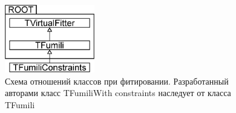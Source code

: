 


\begin{figure}[h]
\centering
\centering\includegraphics[width=0.35\textwidth]{pics/arch1.eps}
\caption{Схема отношений классов при фитировании. Разработанный авторами класс TFumiliWith constraints наследует от класса TFumili
}
\label{arch}
\end{figure}

%


